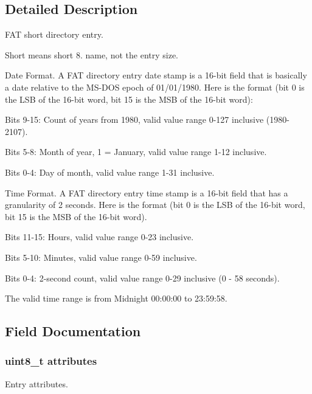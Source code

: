 \subsection{Detailed Description}
F\-A\-T short directory entry. 

Short means short 8. name, not the entry size.

Date Format. A F\-A\-T directory entry date stamp is a 16-\/bit field that is basically a date relative to the M\-S-\/\-D\-O\-S epoch of 01/01/1980. Here is the format (bit 0 is the L\-S\-B of the 16-\/bit word, bit 15 is the M\-S\-B of the 16-\/bit word)\-:

Bits 9-\/15\-: Count of years from 1980, valid value range 0-\/127 inclusive (1980-\/2107).

Bits 5-\/8\-: Month of year, 1 = January, valid value range 1-\/12 inclusive.

Bits 0-\/4\-: Day of month, valid value range 1-\/31 inclusive.

Time Format. A F\-A\-T directory entry time stamp is a 16-\/bit field that has a granularity of 2 seconds. Here is the format (bit 0 is the L\-S\-B of the 16-\/bit word, bit 15 is the M\-S\-B of the 16-\/bit word).

Bits 11-\/15\-: Hours, valid value range 0-\/23 inclusive.

Bits 5-\/10\-: Minutes, valid value range 0-\/59 inclusive.

Bits 0-\/4\-: 2-\/second count, valid value range 0-\/29 inclusive (0 -\/ 58 seconds).

The valid time range is from Midnight 00\-:00\-:00 to 23\-:59\-:58. 

\subsection{Field Documentation}
\hypertarget{structdirectory_entry_a983149395439fbc9ca8497076b75fd6b}{
\subsubsection[{attributes}]{\setlength{\rightskip}{0pt plus 5cm}uint8\-\_\-t attributes}}\label{structdirectory_entry_a983149395439fbc9ca8497076b75fd6b}
Entry attributes.

